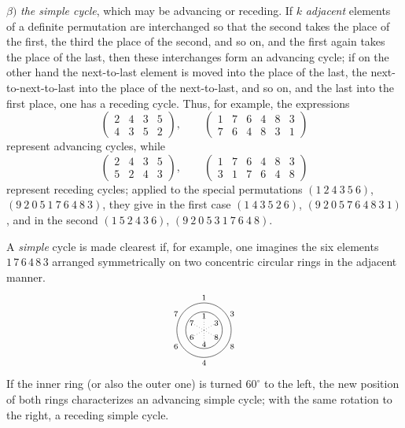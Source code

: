 \documentclass[10pt]{article}
\begin{document}
\(\beta)\) \emph{the simple cycle}, which may be advancing or receding. If \(k\) \emph{adjacent} elements of a definite permutation are interchanged so that the second takes the place of the first, the third the place of the second, and so on, and the first again takes the place of the last, then these interchanges form an advancing cycle; if on the other hand the next-to-last element is moved into the place of the last, the next-to-next-to-last into the place of the next-to-last, and so on, and the last into the first place, one has a receding cycle. Thus, for example, the expressions
\[
\begin{pmatrix}2&4&3&5\\4&3&5&2\end{pmatrix},\qquad
\begin{pmatrix}1&7&6&4&8&3\\7&6&4&8&3&1\end{pmatrix}
\]
represent advancing cycles, while
\[
\begin{pmatrix}2&4&3&5\\5&2&4&3\end{pmatrix},\qquad
\begin{pmatrix}1&7&6&4&8&3\\3&1&7&6&4&8\end{pmatrix}
\]
represent receding cycles; applied to the special permutations \((1\ 2\ 4\ 3\ 5\ 6)\), \((9\ 2\ 0\ 5\ 1\ 7\ 6\ 4\ 8\ 3)\), they give in the first case \((1\ 4\ 3\ 5\ 2\ 6)\), \((9\ 2\ 0\ 5\ 7\ 6\ 4\ 8\ 3\ 1)\), and in the second \((1\ 5\ 2\ 4\ 3\ 6)\), \((9\ 2\ 0\ 5\ 3\ 1\ 7\ 6\ 4\ 8)\).

A \emph{simple} cycle is made clearest if, for example, one imagines the six elements \(1\,7\,6\,4\,8\,3\) arranged symmetrically on two concentric circular rings in the adjacent manner.
\[
\begin{tikzpicture}[scale=0.38,baseline=-0.5ex]
\draw (0,0) circle (2.3);
\draw (0,0) circle (1.55);
\foreach \a in {30,90,150,210,270,330}{\draw[dotted] (0,0)--(\a:1.55);}
\node at (90:2.75) {\scriptsize 1};
\node at (30:2.75) {\scriptsize 3};
\node at (-30:2.75) {\scriptsize 8};
\node at (-90:2.75) {\scriptsize 4};
\node at (-150:2.75) {\scriptsize 6};
\node at (150:2.75) {\scriptsize 7};
\node at (90:1.2) {\scriptsize 1};
\node at (30:1.2) {\scriptsize 3};
\node at (-30:1.2) {\scriptsize 8};
\node at (-90:1.2) {\scriptsize 4};
\node at (-150:1.2) {\scriptsize 6};
\node at (150:1.2) {\scriptsize 7};
\end{tikzpicture}
\]
If the inner ring (or also the outer one) is turned \(60^\circ\) to the left, the new position of both rings characterizes an advancing simple cycle; with the same rotation to the right, a receding simple cycle.
\end{document}
